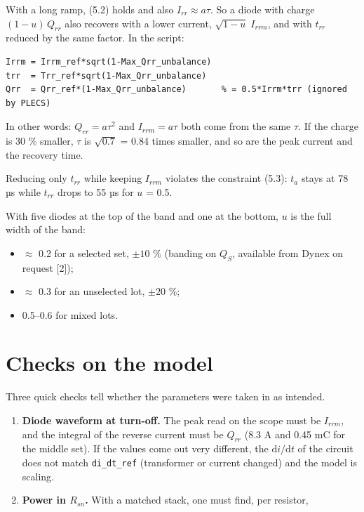 \documentclass[11pt,a4paper,numbers=noenddot]{scrartcl}
\providecommand{\tightlist}{\setlength{\itemsep}{0pt}\setlength{\parskip}{0pt}}
\begin{document}
\begin{onehalfspace}
With a long ramp, (5.2) holds and also \(I_{rr} \approx a\tau\). So a diode with charge \((1-u)\,Q_{rr}\) also recovers with a lower current, \(\sqrt{1-u}\; I_{rrm}\), and with \(t_{rr}\) reduced by the same factor. In the script:

{\small\singlespacing\begin{verbatim}
Irrm = Irrm_ref*sqrt(1-Max_Qrr_unbalance)
trr  = Trr_ref*sqrt(1-Max_Qrr_unbalance)
Qrr  = Qrr_ref*(1-Max_Qrr_unbalance)       % = 0.5*Irrm*trr (ignored by PLECS)
\end{verbatim}}

\begin{mybox}
In other words: \(Q_{rr} = a\tau^2\) and \(I_{rrm} = a\tau\) both come from the same \(\tau\). If the charge is 30 \% smaller, \(\tau\) is \(\sqrt{0.7}\) = 0.84 times smaller, and so are the peak current and the recovery time.
\end{mybox}

Reducing only \(t_{rr}\) while keeping \(I_{rrm}\) violates the constraint (5.3): \(t_a\) stays at 78 µs while \(t_{rr}\) drops to 55 µs for \(u\) = 0.5.

With five diodes at the top of the band and one at the bottom, \(u\) is the full width of the band:

\begin{itemize}
\tightlist
\item
  \(\approx\) 0.2 for a selected set, \(\pm 10\) \% (banding on \(Q_S\), available from Dynex on request {[}2{]});
\item
  \(\approx\) 0.3 for an unselected lot, \(\pm 20\) \%;
\item
  0.5--0.6 for mixed lots.
\end{itemize}

\section{Checks on the model}\label{checks-on-the-model}

Three quick checks tell whether the parameters were taken in as intended.

\begin{enumerate}
\def\labelenumi{\arabic{enumi}.}
\item
  \textbf{Diode waveform at turn-off.} The peak read on the scope must be \(I_{rrm}\), and the integral of the reverse current must be \(Q_{rr}\) (8.3 A and 0.45 mC for the middle set). If the values come out very different, the \(\mathrm{d}i/\mathrm{d}t\) of the circuit does not match \texttt{di\_dt\_ref} (transformer or current changed) and the model is scaling.
\item
  \textbf{Power in \(R_{sn}\).} With a matched stack, one must find, per resistor,


\end{enumerate}
\end{onehalfspace}
\end{document}
